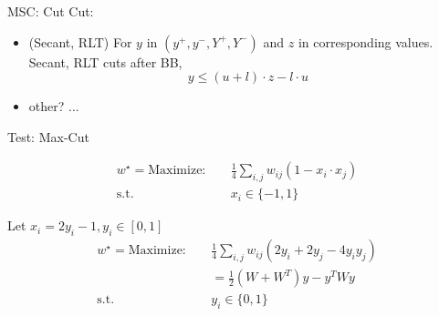 \begin{frame}{MSC: Cut}
  Cut:

  \begin{itemize}
    \item  (Secant, RLT) For \(y\) in \((y^+, y^-, Y^+, Y^-)\) and \(z\) in corresponding values.
          Secant, RLT cuts after BB,
          \[y\le (u + l) \cdot z - l \cdot u\]
    \item other? ...
  \end{itemize}
\end{frame}



\begin{frame}{Test: Max-Cut}

  \[\begin{aligned}
      w^\star = \mathrm{Maximize: } \quad & \frac{1}{4} \sum_{i,j} w_{ij}(1-x_i\cdot x_j) \\
      \mathrm{s.t. }       \quad          & x_i \in \{-1, 1\}
    \end{aligned}
  \]

  Let \(x_i = 2y_i-1, y_i \in [0, 1]\)
  \[\begin{aligned}
      w^\star  = \mathrm{Maximize: } \quad & \frac{1}{4} \sum_{i,j} w_{ij}(2y_i + 2y_j - 4y_iy_j) \\
                                           & =        \frac{1}{2} (W+W^T)y - y^TWy                \\
      \mathrm{s.t. }       \quad           & y_i \in \{0, 1\}
    \end{aligned}
  \]

\end{frame}

